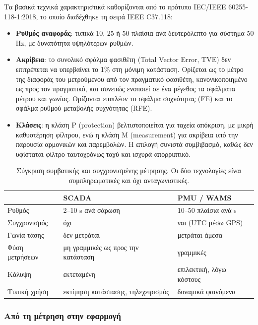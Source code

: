 Τα βασικά τεχνικά χαρακτηριστικά καθορίζονται από το πρότυπο IEC/IEEE 60255-118-1:2018, το
οποίο διαδέχθηκε τη σειρά IEEE C37.118:

\begin{itemize}
\item \textbf{Ρυθμός αναφοράς}: τυπικά 10, 25 ή 50 πλαίσια ανά δευτερόλεπτο για σύστημα
      50 Hz, με δυνατότητα υψηλότερων ρυθμών.
\item \textbf{Ακρίβεια}: το συνολικό σφάλμα φασιθέτη (Total Vector Error, TVE) δεν
      επιτρέπεται να υπερβαίνει το 1\% στη μόνιμη κατάσταση. Ορίζεται ως το μέτρο της
      διαφοράς του μετρούμενου από τον πραγματικό φασιθέτη, κανονικοποιημένο ως προς τον
      πραγματικό, και συνεπώς ενοποιεί σε ένα μέγεθος τα σφάλματα μέτρου και γωνίας.
      Ορίζονται επιπλέον το σφάλμα συχνότητας (FE) και το σφάλμα ρυθμού μεταβολής
      συχνότητας (RFE).
\item \textbf{Κλάσεις}: η κλάση P (protection) βελτιστοποιείται για ταχεία απόκριση, με
      μικρή καθυστέρηση φίλτρου, ενώ η κλάση M (measurement) για ακρίβεια υπό την παρουσία
      αρμονικών και παρεμβολών. Η επιλογή συνιστά συμβιβασμό, καθώς δεν υφίσταται φίλτρο
      ταυτοχρόνως ταχύ και ισχυρά απορριπτικό.
\end{itemize}

\begin{table}[!htbp]
\centering
\begin{tabular}{lll}
\hline
 & SCADA & PMU / WAMS \\
\hline
Ρυθμός           & 2--10 s ανά σάρωση & 10--50 πλαίσια ανά s \\
Συγχρονισμός     & όχι                & ναι (UTC μέσω GPS) \\
Γωνία τάσης      & δεν μετράται       & μετράται άμεσα \\
Φύση μετρήσεων   & μη γραμμικές ως προς την κατάσταση & γραμμικές \\
Κάλυψη           & εκτεταμένη         & επιλεκτική, λόγω κόστους \\
Τυπική χρήση     & εκτίμηση κατάστασης, τηλεχειρισμός & δυναμικά φαινόμενα \\
\hline
\end{tabular}
\caption{Σύγκριση συμβατικής και συγχρονισμένης μέτρησης. Οι δύο τεχνολογίες είναι
συμπληρωματικές και όχι ανταγωνιστικές.}
\label{tab:scada-pmu}
\end{table}

\subsubsection*{Από τη μέτρηση στην εφαρμογή}

